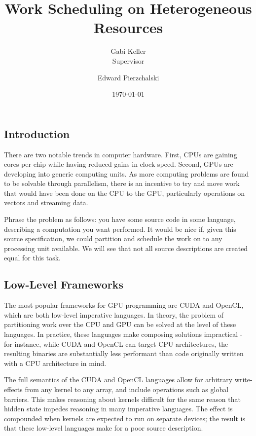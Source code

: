 \documentclass[a4paper,12pt]{article}
\title{Work Scheduling on Heterogeneous Resources}
\date{\today}
\author{Gabi Keller\\\small{Supervisor} \and Edward 
Pierzchalski}
\begin{document}
\begin{titlepage}

\cleardoublepage
\maketitle
\thispagestyle{empty}

\end{titlepage}

\begin{multicols}{2}

\section{Introduction}

There are two notable trends in computer hardware. First, CPUs are gaining cores per chip while having reduced gains in clock speed. Second, GPUs are developing into generic computing units. As more computing problems are found to be solvable through parallelism, there is an incentive to try and move work that would have been done on the CPU to the GPU, particularly operations on vectors and streaming data.

Phrase the problem as follows: you have some source code in some language, describing a computation you want performed. It would be nice if, given this source specification, we could partition and schedule the work on to any processing unit available. We will see that not all source descriptions are created equal for this task.

\subsection{Low-Level Frameworks}

The most popular frameworks for GPU programming are CUDA and OpenCL, which are both low-level imperative languages. In theory, the problem of partitioning work over the CPU and GPU can be solved at the level of these languages. In practice, these languages make composing solutions impractical - for instance, while CUDA and OpenCL can target CPU architectures, the resulting binaries are substantially less performant than code originally written with a CPU architecture in mind. 

The full semantics of the CUDA and OpenCL languages allow for arbitrary write-effects from any kernel to any array, and include operations such as global barriers. This makes reasoning about kernels difficult for the same reason that hidden state impedes reasoning in many imperative languages. The effect is compounded when kernels are expected to run on separate devices; the result is that these low-level languages make for a poor source description.


\end{multicols}
\end{document}
